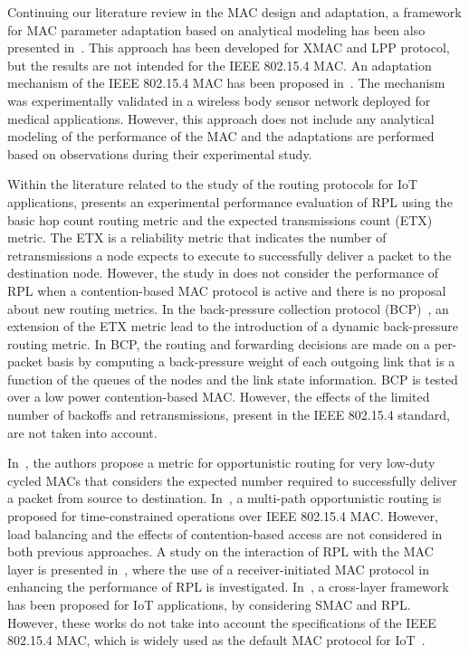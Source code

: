 \documentclass[review, 1p, 11pt]{elsarticle}
\numberwithin{equation}{section}
\begin{document}
Continuing our literature review in the MAC design and adaptation, a framework for MAC parameter adaptation based on analytical modeling has been also presented
in~\cite{ptunes}. This approach has been developed for XMAC and LPP protocol, but the results are not intended for the IEEE 802.15.4 MAC. An adaptation mechanism of the IEEE 802.15.4 MAC has been proposed in~\cite{Timmons04}. The mechanism was experimentally validated in a wireless body sensor network deployed for medical applications. However, this approach does not include any analytical modeling of the performance of the MAC and the adaptations are performed based on observations during their experimental study.

Within the literature related to the study of the routing protocols for IoT applications, \cite{perf_RPL} presents an experimental performance evaluation
of RPL using the basic hop count routing metric and the expected transmissions count (ETX)~\cite{ETX} metric.
The ETX is a reliability metric that indicates the number of retransmissions a node expects to execute to successfully deliver a packet  to the
destination node.
However, the study in \cite{perf_RPL} does not consider the performance of RPL when a contention-based MAC protocol is active and there is no proposal about new routing metrics.
In the back-pressure collection protocol (BCP)~\cite{BCP}, an extension of the ETX metric lead to the introduction of a dynamic back-pressure routing metric. In BCP, the routing and forwarding decisions are made on a per-packet basis by computing a back-pressure weight of each outgoing
link that is a function of the queues of the nodes and the link state information. BCP is tested over a low power contention-based MAC. However, the effects of the limited number of backoffs and retransmissions, present in the IEEE 802.15.4 standard, are not taken into account.

In~\cite{ghadimi_secon}, the authors propose a metric for opportunistic routing for very low-duty cycled MACs that considers the expected number required to successfully deliver a packet from source to destination. In~\cite{Pavkovic:2011}, a multi-path opportunistic routing is proposed for time-constrained operations over IEEE 802.15.4 MAC. However, load balancing and the effects of contention-based access are not considered in both previous approaches.
A study on the interaction of RPL with the MAC layer is presented in~\cite{RPL11}, where  the use of a receiver-initiated MAC protocol in enhancing the performance of RPL is investigated.
In~\cite{Han13}, a cross-layer framework has been proposed for IoT applications, by considering SMAC and RPL.
However, these works do not take into account the specifications of the IEEE 802.15.4 MAC, which is widely used as the default MAC protocol for IoT~\cite{palattella_iot}.
\end{document}
